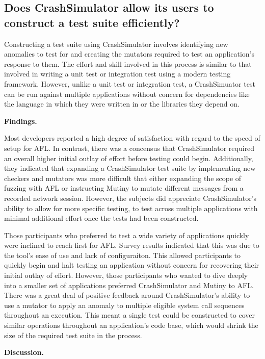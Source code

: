 \subsection{Does CrashSimulator allow its users to construct a test suite
efficiently?}

Constructing a test suite using CrashSimulator involves identifying new
anomalies to test for and creating the mutators required
to test an application's response to them.
The effort and skill involved in
this process is similar to that involved in writing a unit test or
integration test using a modern testing framework.  However, unlike a unit
test or integration test, a CrashSimuator test can be run
against multiple
applications without concern for dependencies like the language in which
they were
written in or the libraries they depend on.


{\bf Findings. }


Most developers reported a high degree of
satisfaction with regard to the speed
of setup for AFL.  In contrast, there was a concensus that
CrashSimulator required an
overall higher initial outlay of effort before testing could begin.
Additionally, they indicated that expanding a CrashSimulator test suite by
implementing new checkers and mutators was more difficult that either
expanding the scope of fuzzing with AFL or instructing Mutiny to mutate
different messages from a recorded network session.  However, the subjects
did appreciate
CrashSimulator's ability to allow for
more specific testing,
to test across multiple applications
with minimal additional effort once the tests had been constructed.

Those participants who preferred to test a wide variety of applications
quickly were inclined to reach first for AFL.  Survey results indicated
that this was due to the tool's ease of use and lack of configuraiton.
This allowed participants to quickly begin and halt testing an application
without concern for recovering their initial outlay of effort.  However,
those participants
who wanted to dive deeply into a smaller set of applications
preferred CrashSimulator and Mutiny to AFL.  There was a great deal of
positive feedback around CrashSimulator's ability to use a mutator to apply
an anomaly to multiple eligible system call sequences throughout an
execution.  This meant a single test could be constructed to cover similar
operations throughout an application's code base, which would
shrink the size of the
required test suite in the process.


{\bf Discussion. }

